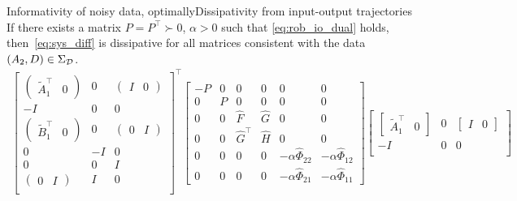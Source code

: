 \documentclass[aspectratio=169, handout, 10pt, hyperref=colorlinks]{beamer}
\begin{document}
\begin{frame}[allowframebreaks]{Informativity of noisy data, optimally}{Dissipativity from input-output trajectories}
        If there exists a matrix $P =P^\top \succ 0$, $\alpha > 0$ such that \eqref{eq:rob_io_dual} holds,
        then~\eqref{eq:sys_diff} is dissipative for all matrices consistent with the data $(A_2, D) \in \Sigma_{\mathcal{D}}$.
        {\footnotesize
        \begin{align}\label{eq:rob_io_dual}
        \left[
        \begin{array}{ccc}
        \begin{pmatrix}\widetilde{A}_1^\top & 0\end{pmatrix} & 0 & \begin{pmatrix}I & 0\end{pmatrix} \\ 
        -I & 0 & 0 \\
        \begin{pmatrix} \widetilde{B}_1^\top & 0 \end{pmatrix} & 0 & \begin{pmatrix} 0 & I \end{pmatrix} \\ 
        0 & -I & 0 \\
        0 & 0 & I \\ 
        \begin{pmatrix} 0&I \end{pmatrix} & I & 0 \\
        \end{array}
        \right]^\top
        \begin{bmatrix}
        -P&0&0&0&0&0\\
        0&P&0&0&0&0\\\hline
        0&0&\hat{F}&\hat{G}&0&0\\
        0&0&\hat{G}^\top&\hat{H}&0&0\\\hline
        0&0&0&0& -\alpha {\hat{\Phi}}_{22}&-\alpha {\hat{\Phi}}_{12} \\
        0&0&0&0&-\alpha {\hat{\Phi}}_{21} & -\alpha {\hat{\Phi}}_{11}
        \end{bmatrix}
        \begin{bmatrix}
        \begin{bmatrix}\widetilde{A}_1^\top & 0\end{bmatrix} & 0 & \begin{bmatrix}I & 0\end{bmatrix} \\ 
        -I & 0 & 0 \\

\end{bmatrix}
\end{align}}
\end{frame}
\end{document}
